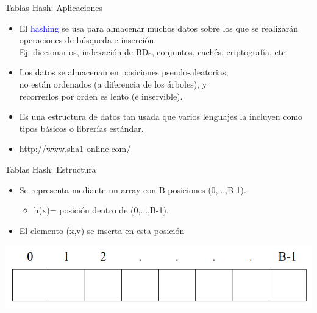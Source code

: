 \documentclass[handout]{beamer} %
\newcommand{\blue}[1]{\textcolor{blue}{#1}}
\begin{document}
\begin{frame}{Tablas Hash: Aplicaciones}
    \begin{itemize}
        \item<1-> El \blue{hashing} se usa para almacenar muchos datos sobre los que se realizarán operaciones de búsqueda e inserción.\\
        {\footnotesize Ej: diccionarios, indexación de BDs, conjuntos, cachés, criptografía, etc.}
        \item<2-> Los datos se almacenan en posiciones pseudo-aleatorias,\\no están ordenados (a diferencia de los árboles), y\\ recorrerlos por orden es lento (e inservible).
        \item<3-> Es una estructura de datos tan usada que varios lenguajes la incluyen como tipos básicos o librerías estándar.
        \item<4-> \blue{\url{http://www.sha1-online.com/}}
    \end{itemize}
\end{frame}

\begin{frame}{Tablas Hash: Estructura}
    \begin{itemize}
        \item Se representa mediante un array con B posiciones (0,...,B-1).
         \begin{itemize}
           \item h(x)= posición dentro de  (0,...,B-1).
         \end{itemize}
        \item El elemento (x,v) se inserta en esta posición
    \end{itemize}

    \begin{center}
        \includegraphics[width=.8\textwidth]{./image/cap4/hassh_array.png}
    \end{center}

\end{frame}
\end{document}
